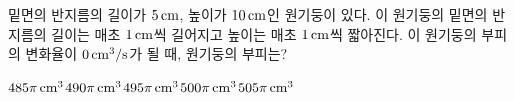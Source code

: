 밑면의 반지름의 길이가 $5\mkern3mu \mathrm{cm}$, 높이가 $10\mkern3mu \mathrm{cm}$인 원기둥이 있다. 이 원기둥의 밑면의 반지름의 길이는 매초 $1\mkern3mu \mathrm{cm}$씩 길어지고 높이는 매초 $1\mkern3mu \mathrm{cm}$씩 짧아진다. 이 원기둥의 부피의 변화율이 $0\mkern3mu \mathrm{cm}^3/\mathrm{s}$가 될 때, 원기둥의 부피는?
\begin{choices32}{$485\pi\mkern3mu \mathrm{cm}^3$}{$490\pi\mkern3mu \mathrm{cm}^3$}{$495\pi\mkern3mu \mathrm{cm}^3$}{$500\pi\mkern3mu \mathrm{cm}^3$}{$505\pi\mkern3mu \mathrm{cm}^3$}\end{choices32}
